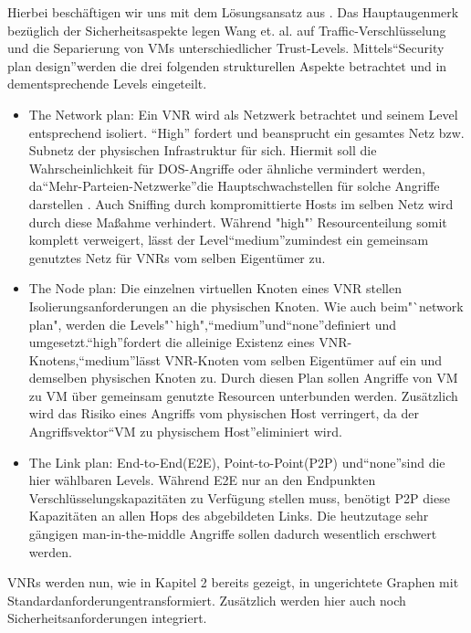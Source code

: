 \documentclass{lni}
\begin{document}
Hierbei beschäftigen wir uns mit dem Lösungsansatz aus \cite{wang2016towards}. 
Das Hauptaugenmerk bezüglich der Sicherheitsaspekte legen Wang et. al. auf Traffic-Verschlüsselung und die Separierung von VMs unterschiedlicher Trust-Levels. Mittels"`Security plan design"'werden die drei folgenden strukturellen Aspekte betrachtet und in dementsprechende Levels eingeteilt.
\begin{itemize}
\item The Network plan:\newline
Ein VNR wird als Netzwerk betrachtet und seinem Level entsprechend isoliert. "`High"' fordert und beansprucht ein gesamtes Netz bzw. Subnetz der physischen Infrastruktur für sich. Hiermit soll die Wahrscheinlichkeit für DOS-Angriffe oder ähnliche vermindert werden, da"`Mehr-Parteien-Netzwerke"'die Hauptschwachstellen für solche Angriffe darstellen \cite{DOS}. Auch Sniffing durch kompromittierte Hosts im selben Netz wird durch diese Maßahme verhindert. Während "high"' Resourcenteilung somit komplett verweigert, lässt der Level"`medium"'zumindest ein gemeinsam genutztes Netz für VNRs vom selben Eigentümer zu.

\item The Node plan:\newline
Die einzelnen virtuellen Knoten eines VNR stellen Isolierungsanforderungen an die physischen Knoten. Wie auch beim"`network plan", werden die Levels"`high","`medium"'und"`none"'definiert und umgesetzt."`high"'fordert die alleinige Existenz eines VNR-Knotens,"`medium"'lässt VNR-Knoten vom selben Eigentümer auf ein und demselben physischen Knoten zu. Durch diesen Plan sollen Angriffe von VM zu VM über gemeinsam genutzte Resourcen unterbunden werden. Zusätzlich wird das Risiko eines Angriffs vom physischen Host verringert, da der Angriffsvektor"`VM zu physischem Host"'eliminiert wird.

\item The Link plan:\newline
End-to-End(E2E), Point-to-Point(P2P) und"`none"'sind die hier wählbaren Levels. Während E2E nur an den Endpunkten Verschlüsselungskapazitäten zu Verfügung stellen muss, benötigt P2P diese Kapazitäten an allen Hops des abgebildeten Links. Die heutzutage sehr gängigen man-in-the-middle Angriffe sollen dadurch wesentlich erschwert werden. 
\end{itemize}
VNRs werden nun, wie in Kapitel 2 bereits gezeigt, in ungerichtete Graphen mit Standardanforderungentransformiert. Zusätzlich werden hier auch noch Sicherheitsanforderungen integriert.\newline
\end{document}
